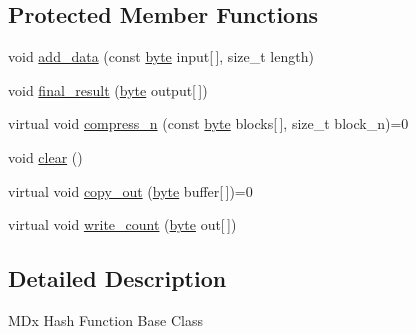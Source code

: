\subsection*{Protected Member Functions}
\begin{DoxyCompactItemize}
\item 
void \hyperlink{classBotan_1_1MDx__HashFunction_a362870480bdc2288c9f56a6cc985b4ec}{add\-\_\-data} (const \hyperlink{namespaceBotan_a7d793989d801281df48c6b19616b8b84}{byte} input\mbox{[}$\,$\mbox{]}, size\-\_\-t length)
\item 
void \hyperlink{classBotan_1_1MDx__HashFunction_aeaa4109d484276e18033290ae7165a9a}{final\-\_\-result} (\hyperlink{namespaceBotan_a7d793989d801281df48c6b19616b8b84}{byte} output\mbox{[}$\,$\mbox{]})
\item 
virtual void \hyperlink{classBotan_1_1MDx__HashFunction_a6b8d4468c51210a8b4686eb1a2d63bdb}{compress\-\_\-n} (const \hyperlink{namespaceBotan_a7d793989d801281df48c6b19616b8b84}{byte} blocks\mbox{[}$\,$\mbox{]}, size\-\_\-t block\-\_\-n)=0
\item 
void \hyperlink{classBotan_1_1MDx__HashFunction_ad32c3f024a4eba7bd1d53372dc248a86}{clear} ()
\item 
virtual void \hyperlink{classBotan_1_1MDx__HashFunction_ab2f1da9783cfcf5970e468f846196686}{copy\-\_\-out} (\hyperlink{namespaceBotan_a7d793989d801281df48c6b19616b8b84}{byte} buffer\mbox{[}$\,$\mbox{]})=0
\item 
virtual void \hyperlink{classBotan_1_1MDx__HashFunction_ac3afb737a20ccfb7bfc0b9d119a2eba1}{write\-\_\-count} (\hyperlink{namespaceBotan_a7d793989d801281df48c6b19616b8b84}{byte} out\mbox{[}$\,$\mbox{]})
\end{DoxyCompactItemize}


\subsection{Detailed Description}
M\-Dx Hash Function Base Class 

